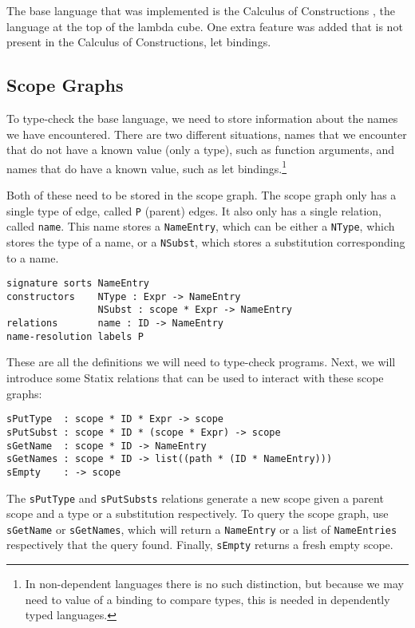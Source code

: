 \documentclass[a4paper,UKenglish,cleveref, autoref, thm-restate]{oasics-v2021}
\begin{document}
The base language that was implemented is the Calculus of Constructions \cite{Coquand_Huet_1988}, the language at the top of the lambda cube. One extra feature was added that is not present in the Calculus of Constructions, let bindings.

\subsection{Scope Graphs}

To type-check the base language, we need to store information about the names we have encountered. There are two different situations, names that we encounter that do not have a known value (only a type), such as function arguments, and names that do have a known value, such as let bindings.\footnote{In non-dependent languages there is no such distinction, but because we may need to value of a binding to compare types, this is needed in dependently typed languages.}

Both of these need to be stored in the scope graph. The scope graph only has a single type of edge, called \verb|P| (parent) edges. It also only has a single relation, called \verb|name|. This name stores a \verb|NameEntry|, which can be either a \verb|NType|, which stores the type of a name, or a \verb|NSubst|, which stores a substitution corresponding to a name. 

\begin{lstlisting}
signature sorts	NameEntry
constructors    NType : Expr -> NameEntry
                NSubst : scope * Expr -> NameEntry
relations       name : ID -> NameEntry
name-resolution	labels P
\end{lstlisting}

These are all the definitions we will need to type-check programs. Next, we will introduce some Statix relations that can be used to interact with these scope graphs:

\begin{lstlisting}
sPutType  : scope * ID * Expr -> scope
sPutSubst : scope * ID * (scope * Expr) -> scope
sGetName  : scope * ID -> NameEntry
sGetNames : scope * ID -> list((path * (ID * NameEntry)))
sEmpty    : -> scope
\end{lstlisting}

The \verb|sPutType| and \verb|sPutSubsts| relations generate a new scope given a parent scope and a type or a substitution respectively. To query the scope graph, use \verb|sGetName| or \verb|sGetNames|, which will return a \verb|NameEntry| or a list of \verb|NameEntries| respectively that the query found. Finally, \verb|sEmpty| returns a fresh empty scope.
\end{document}
